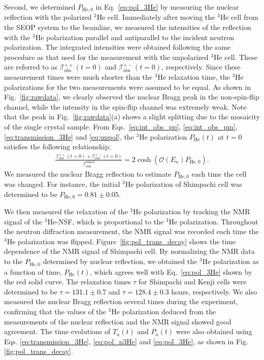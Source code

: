 \documentclass[%
 reprint,
superscriptaddress,
 amsmath,amssymb,
 aps,
floatfix,
]{revtex4-2}
\newcommand{\He}{$^3$He }
\newcommand{\Hensf}{$^3$He-NSF}
\begin{document}
Second, we determined $P_\mathrm{He,0}$ in Eq.~\ref{eq:pol_3He} by measuring the nuclear reflection with the polarized \He cell.
Immediately after moving the \He cell from the SEOP system to the beamline, we measured the intensities of the reflection with the \He polarization parallel and antiparallel to the incident neutron polarization.
The integrated intensities were obtained following the same procedure as that used for the measurement with the unpolarized \He cell.
These are referred to as $\mathcal{I}^\mathrm{++}_\mathrm{obs}(t=0)$ and $\mathcal{I}^\mathrm{+-}_\mathrm{obs}(t=0)$, respectively.
Since these measurement times were much shorter than the \He relaxation time, the \He polarizations for the two measurements were assumed to be equal.
As shown in Fig.~\ref{fig:rawdata}, we clearly observed the nuclear Bragg peak in the non-spin-flip channel, while the intensity in the spin-flip channel was extremely weak.
Note that the peak in Fig.~\ref{fig:rawdata}(a) shows a slight splitting due to the mosaicity of the single crystal sample.
From Eqs.~\ref{eq:int_obs_pp}, \ref{eq:int_obs_pm}, \ref{eq:transmission_3He} and \ref{eq:unpol}, the \He polarization $P_\mathrm{He}(t)$ at $t=0$ satisfies the following relationship:
\begin{align}
    \frac{\mathcal{I}^{++}_\mathrm{obs}(t=0)+\mathcal{I}^{+-}_\mathrm{obs}(t=0)}{\mathcal{I}^\mathrm{unpol}_\mathrm{obs}} = 2\cosh(\mathcal{O}(E_n)P_\mathrm{He,0}).
    \label{eq:transmission_ratio}
\end{align}
We measured the nuclear Bragg reflection to estimate $P_\mathrm{He,0}$ each time the cell was changed.
For instance, the initial \He polarization of Shimpachi cell was determined to be $P_\mathrm{He,0}=0.81\pm0.05$.

We then measured the relaxation of the \He polarization by tracking the NMR signal of the \Hensf, which is proportional to the \He polarization.
Throughout the neutron diffraction measurement, the NMR signal was recorded each time the \He polarization was flipped.
Figure~\ref{fig:pol_trans_decay} shows the time dependence of the NMR signal of Shimpachi cell.
By normalizing the NMR data to the $P_\mathrm{He,0}$ determined by nuclear reflection, we obtained the \He polarization as a function of time, $P_\mathrm{He}(t)$, which agrees well with Eq.~\ref{eq:pol_3He} shown by the red solid curve.
The relaxation times $\tau$ for Shimpachi and Kenji cells were determined to be $\tau = 131.1 \pm 0.7$ and $\tau = 128.4 \pm 0.3$ hours, respectively.
We also measured the nuclear Bragg reflection several times during the experiment, confirming that the values of the \He polarization deduced from the measurements of the nuclear reflection and the NMR signal showed good agreement. %
The time evolutions of $T_a(t)$ and $P_a(t)$ were also obtained using Eqs. \ref{eq:transmission_3He}, \ref{eq:pol_n3He} and \ref{eq:pol_3He}, as shown in Fig. \ref{fig:pol_trans_decay}.
\end{document}
